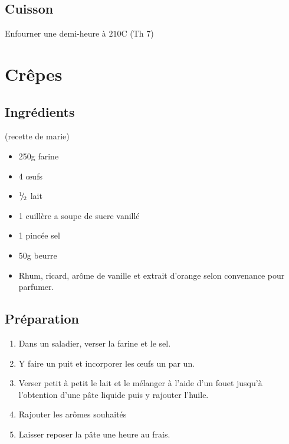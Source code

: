 \subsection*{Cuisson}
Enfourner une demi-heure à $210$\degres C (Th 7)

\newpage
\section{Crêpes}
\subsection*{Ingrédients}

(recette de marie)

\begin{itemize}
\item 250g farine
\item 4 œufs
\item ${{}^{1\!\!}/ _{\!2}}$ lait
\item 1 cuillère a soupe de sucre vanillé
\item 1 pincée sel
\item 50g beurre
\item Rhum, ricard, arôme de vanille et extrait d'orange selon convenance pour parfumer.
\end{itemize}


\subsection*{Préparation}
\begin{enumerate}
\item Dans un saladier, verser la farine et le sel.
\item Y faire un puit et incorporer les œufs un par un.
\item Verser petit à petit le lait et le mélanger à l'aide d'un fouet jusqu'à l'obtention d'une pâte liquide puis y rajouter l'huile.
\item Rajouter les arômes souhaités
\item Laisser reposer la pâte une heure au frais.
\end{enumerate}


